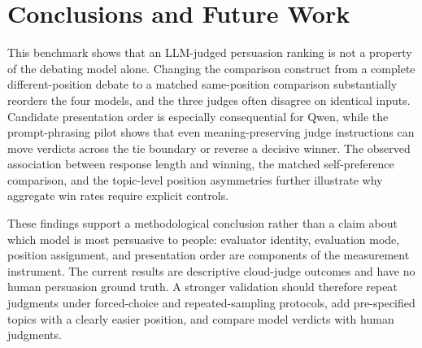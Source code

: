 \documentclass{article}
\begin{document}

\section{Conclusions and Future Work}
This benchmark shows that an LLM-judged persuasion ranking is not a property of the debating model alone. Changing the comparison construct from a complete different-position debate to a matched same-position comparison substantially reorders the four models, and the three judges often disagree on identical inputs. Candidate presentation order is especially consequential for Qwen, while the prompt-phrasing pilot shows that even meaning-preserving judge instructions can move verdicts across the tie boundary or reverse a decisive winner. The observed association between response length and winning, the matched self-preference comparison, and the topic-level position asymmetries further illustrate why aggregate win rates require explicit controls.

These findings support a methodological conclusion rather than a claim about which model is most persuasive to people: evaluator identity, evaluation mode, position assignment, and presentation order are components of the measurement instrument. The current results are descriptive cloud-judge outcomes and have no human persuasion ground truth. A stronger validation should therefore repeat judgments under forced-choice and repeated-sampling protocols, add pre-specified topics with a clearly easier position, and compare model verdicts with human judgments.
\end{document}
